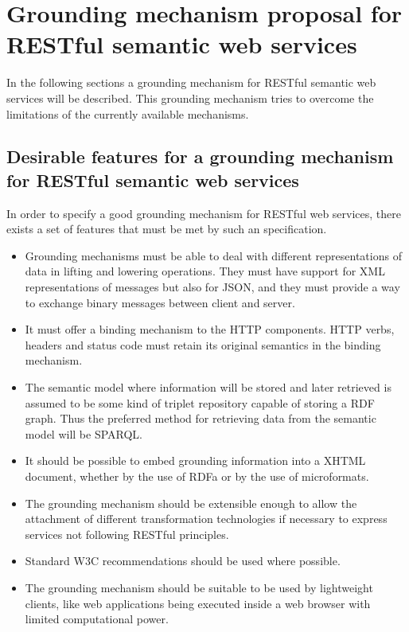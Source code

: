 \section{Grounding mechanism proposal for RESTful semantic web services}

In the following sections a grounding mechanism for RESTful semantic web services will be described. This grounding mechanism tries to overcome the limitations of the currently available mechanisms. 

\subsection{Desirable features for a grounding mechanism for RESTful semantic web services}

In order to specify a good grounding mechanism for RESTful web services, there exists a set of features that must be met by such an specification. 

\begin{itemize}
  \item Grounding mechanisms must be able to deal with different representations of data in lifting and lowering operations. They must have support for XML representations of messages but also for JSON, and they must provide a way to exchange binary messages between client and server.
  \item It must offer a binding mechanism to the HTTP components. HTTP verbs, headers and status code must retain its original semantics in the binding mechanism.
  \item The semantic model where information will be stored and later retrieved is assumed to be some kind of triplet repository capable of storing a RDF graph. Thus the preferred method for retrieving data from the semantic model will be SPARQL.
   \item It should be possible to embed grounding information into a XHTML document, whether by the use of RDFa or by the use of microformats.
   \item The grounding mechanism should be extensible enough to allow the attachment of different transformation technologies if necessary to express services not following RESTful principles.
   \item Standard W3C recommendations should be used where possible.
   \item The grounding mechanism should be suitable to be used by lightweight clients, like web applications being executed inside a web browser with limited computational power.
\end{itemize}


